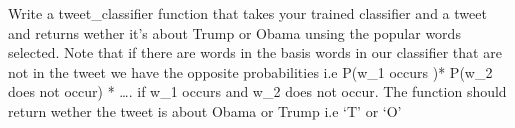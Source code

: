 \documentclass[11pt]{article}
\makeatletter
\newcommand{\boxspacing}{\kern\kvtcb@left@rule\kern\kvtcb@boxsep}
\newcommand{\prompt}[4]{
        {\ttfamily\llap{{\color{#2}[#3]:\hspace{3pt}#4}}\vspace{-\baselineskip}}
    }
\makeatother
\begin{document}
    Write a tweet\_classifier function that takes your trained classifier
and a tweet and returns wether it's about Trump or Obama unsing the
popular words selected. Note that if there are words in the basis words
in our classifier that are not in the tweet we have the opposite
probabilities i.e P(w\_1 occurs )* P(w\_2 does not occur) * \ldots. if
w\_1 occurs and w\_2 does not occur. The function should return wether
the tweet is about Obama or Trump i.e `T' or `O'

    \begin{tcolorbox}[breakable, size=fbox, boxrule=1pt, pad at break*=1mm,colback=cellbackground, colframe=cellborder]
\prompt{In}{incolor}{ }{\boxspacing}
\begin{Verbatim}[commandchars=\\\{\}]

\end{Verbatim}
\end{tcolorbox}

    \begin{tcolorbox}[breakable, size=fbox, boxrule=1pt, pad at break*=1mm,colback=cellbackground, colframe=cellborder]
\prompt{In}{incolor}{ }{\boxspacing}
\begin{Verbatim}[commandchars=\\\{\}]

\end{Verbatim}
\end{tcolorbox}

    \begin{tcolorbox}[breakable, size=fbox, boxrule=1pt, pad at break*=1mm,colback=cellbackground, colframe=cellborder]
\prompt{In}{incolor}{ }{\boxspacing}
\begin{Verbatim}[commandchars=\\\{\}]

\end{Verbatim}
\end{tcolorbox}
\end{document}
